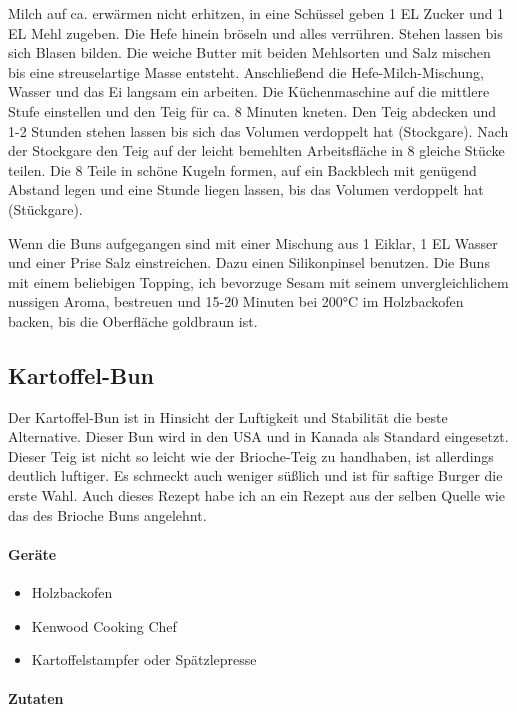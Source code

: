 Milch auf ca. erwärmen nicht erhitzen, in eine Schüssel geben 1 EL Zucker und 1 EL Mehl
zugeben. Die Hefe hinein bröseln und alles verrühren. Stehen lassen
bis sich Blasen bilden. 
Die weiche Butter mit beiden Mehlsorten und Salz mischen bis eine streuselartige
Masse entsteht. Anschließend die Hefe-Milch-Mischung, Wasser und das Ei
langsam ein arbeiten. Die Küchenmaschine auf die mittlere Stufe einstellen und 
den Teig für ca. 8 Minuten kneten. Den Teig abdecken und 1-2 Stunden stehen lassen
bis sich das Volumen verdoppelt hat (Stockgare).
Nach der Stockgare den Teig auf der leicht bemehlten Arbeitsfläche in 8 gleiche Stücke
teilen. Die 8 Teile in schöne Kugeln formen, auf ein Backblech mit genügend Abstand legen
und eine Stunde liegen lassen, bis das Volumen verdoppelt hat (Stückgare).

Wenn die Buns aufgegangen sind mit einer Mischung aus 1 Eiklar, 1 EL Wasser und einer 
Prise Salz einstreichen. Dazu einen Silikonpinsel benutzen. Die Buns mit einem beliebigen
Topping, ich bevorzuge Sesam mit seinem unvergleichlichem nussigen Aroma, bestreuen
und 15-20 Minuten bei 200°C im Holzbackofen backen, bis die Oberfläche goldbraun ist.

\subsection{Kartoffel-Bun}
Der Kartoffel-Bun ist in Hinsicht der Luftigkeit und Stabilität die beste Alternative. Dieser 
Bun wird in den USA und in Kanada als Standard eingesetzt. Dieser Teig ist nicht so leicht 
wie der Brioche-Teig zu handhaben, ist allerdings deutlich luftiger. Es schmeckt auch 
weniger süßlich und ist für saftige Burger die erste Wahl. Auch dieses Rezept habe ich
an ein Rezept aus der selben Quelle wie das des Brioche Buns angelehnt.

\paragraph{Geräte}

\begin{itemize}[noitemsep]
	\item Holzbackofen
	\item Kenwood Cooking Chef
	\item Kartoffelstampfer oder Spätzlepresse
\end{itemize}

\paragraph{Zutaten}

